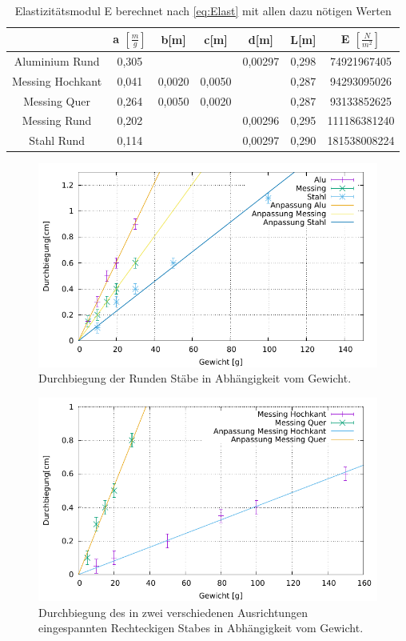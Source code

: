 \begin{table}[h]
	\caption{Elastizitätsmodul E berechnet nach \ref{eq:Elast} mit allen dazu nötigen Werten}
	\begin{tabular}{|c|c|c|c|c|c|c|}
		\hline
		& a $\left[ \frac{m}{g} \right]$& b[m]& c[m] & d[m] & L[m] & E $\left[\frac{N}{m^2}  \right]$ \\
		\hline
		Aluminium Rund & 0,305 & & & 0,00297 & 0,298 & 74921967405\\
		\hline
		Messing Hochkant & 0,041 & 0,0020 & 0,0050 && 0,287 & 94293095026\\
		\hline
		Messing Quer & 0,264 & 0,0050 & 0,0020 && 0,287 & 93133852625\\
		\hline
		Messing Rund & 0,202 &&& 0,00296 & 0,295 & 111186381240\\
		\hline
		Stahl Rund & 0,114 &&& 0,00297 & 0,290 & 181538008224\\
		\hline
	\end{tabular}
\label{tab:Ela}
\end{table}

\begin{figure}[h]
	\centering
	\includegraphics[width=1\textwidth]{res/Rund.pdf}
	\caption{Durchbiegung der Runden Stäbe in Abhängigkeit vom Gewicht.}
	\label{figdurchbiegungRund}
\end{figure}

\begin{figure}[h]
	\centering
	\includegraphics[width=1\textwidth]{res/Eckig.pdf}
	\caption{Durchbiegung des in zwei verschiedenen Ausrichtungen eingespannten Rechteckigen Stabes in Abhängigkeit vom Gewicht.}
	\label{fig:durchbiegungEckig}
\end{figure}


